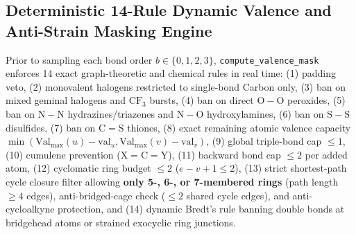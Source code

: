 \documentclass[10pt,a4paper]{article}
\begin{document}
\subsection{Deterministic 14-Rule Dynamic Valence and Anti-Strain Masking Engine}
Prior to sampling each bond order $b \in \{0, 1, 2, 3\}$, \texttt{compute\_valence\_mask} enforces 14 exact graph-theoretic and chemical rules in real time: (1) padding veto, (2) monovalent halogens restricted to single-bond Carbon only, (3) ban on mixed geminal halogens and $\mathrm{CF}_3$ bursts, (4) ban on direct $\mathrm{O}{-}\mathrm{O}$ peroxides, (5) ban on $\mathrm{N}{-}\mathrm{N}$ hydrazines/triazenes and $\mathrm{N}{-}\mathrm{O}$ hydroxylamines, (6) ban on $\mathrm{S}{-}\mathrm{S}$ disulfides, (7) ban on $\mathrm{C}{=}\mathrm{S}$ thiones, (8) exact remaining atomic valence capacity $\min(\mathrm{Val}_{\max}(u)-\mathrm{val}_u, \mathrm{Val}_{\max}(v)-\mathrm{val}_v)$, (9) global triple-bond cap $\le 1$, (10) cumulene prevention ($\mathrm{X}{=}\mathrm{C}{=}\mathrm{Y}$), (11) backward bond cap $\le 2$ per added atom, (12) cyclomatic ring budget $\le 2$ ($e - v + 1 \le 2$), (13) strict shortest-path cycle closure filter allowing \textbf{only 5-, 6-, or 7-membered rings} (path length $\ge 4$ edges), anti-bridged-cage check ($\le 2$ shared cycle edges), and anti-cycloalkyne protection, and (14) dynamic Bredt's rule banning double bonds at bridgehead atoms or strained exocyclic ring junctions.
\end{document}
